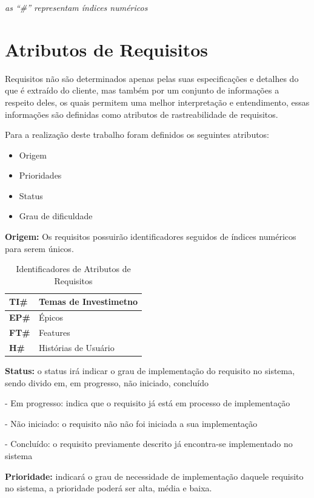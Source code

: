 \textit{as “\#” representam índices numéricos}

\section{Atributos de Requisitos}
Requisitos não são determinados apenas pelas suas especificações e detalhes do que é extraído do cliente, mas também por
 um conjunto de informações a respeito deles, os quais permitem uma melhor interpretação e entendimento, essas informações
  são definidas como atributos de rastreabilidade de requisitos.

	Para a realização deste trabalho foram definidos os seguintes atributos:

	\begin{itemize}
		\item Origem
		\item Prioridades
		\item Status
		\item Grau de dificuldade
	\end{itemize}

\textbf{Origem:} Os requisitos possuirão identificadores seguidos de índices numéricos para serem únicos.

\begin{table}[!h]
	\centering
	\caption{Identificadores de Atributos de Requisitos}
	\label{my-label}
	\begin{tabular}{|l|l|}
	\hline
	\textbf{TI\#} & Temas de Investimetno \\ \hline
	\textbf{EP\#} & Épicos                \\ \hline
	\textbf{FT\#} & Features              \\ \hline
	\textbf{H\#}  & Histórias de Usuário  \\ \hline
	\end{tabular}
\end{table}

\textbf{Status:} o status irá indicar o grau de implementação do requisito no sistema, sendo divido em, em progresso, não iniciado,
 concluído

- Em progresso: indica que o requisito já está em processo de implementação

- Não iniciado: o requisito não não foi iniciada a sua implementação

- Concluído: o requisito previamente descrito já encontra-se implementado no sistema

\textbf{Prioridade:} indicará o grau de necessidade de implementação daquele requisito no sistema, a prioridade poderá ser alta, média e baixa.


